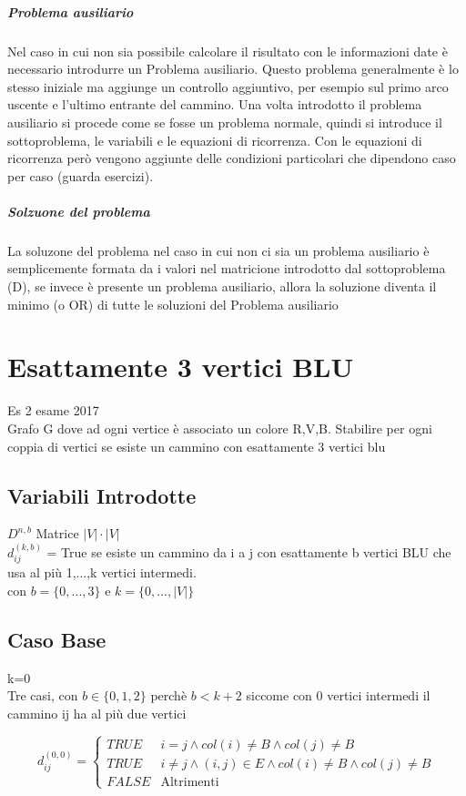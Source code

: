 \documentclass[12pt, a4paper, openany]{book}
\begin{document}
\subparagraph{Problema ausiliario} Nel caso in cui non sia possibile calcolare il risultato con le informazioni date è necessario introdurre un Problema ausiliario.
Questo problema generalmente è lo stesso iniziale ma aggiunge un controllo aggiuntivo, per esempio sul primo arco uscente e l'ultimo entrante del cammino.
Una volta introdotto il problema ausiliario si procede come se fosse un problema normale, quindi si introduce il sottoproblema, le variabili e le equazioni di ricorrenza.
Con le equazioni di ricorrenza però vengono aggiunte delle condizioni particolari che dipendono caso per caso (guarda esercizi).

\subparagraph{Solzuone del problema} La soluzone del problema nel caso in cui non ci sia un problema ausiliario è semplicemente formata da i valori nel matricione introdotto dal sottoproblema (D),
se invece è presente un problema ausiliario, allora la soluzione diventa il minimo (o OR) di tutte le soluzioni del Problema ausiliario
\section{Esattamente 3 vertici BLU} Es 2 esame 2017\\
Grafo G dove ad ogni vertice è associato un colore {R,V,B}. Stabilire per ogni coppia di vertici se esiste un cammino con esattamente 3 vertici blu

\subsection*{Variabili Introdotte}
$D^{n,b}$ Matrice $|V|\cdot|V|$\\
$d^{(k,b)}_{ij}$ = True se esiste un cammino da i a j con esattamente b vertici BLU che usa al più {1,...,k} vertici intermedi.\\
con $b = \{0,...,3\}$ e $k=\{0,...,|V|\}$

\subsection*{Caso Base} k=0\\
Tre casi, con $b \in \{0,1,2\}$ perchè $b < k+2$ siccome con 0 vertici intermedi il cammino ij ha al più due vertici

\begin{equation*}
    d_{ij}^{(0,0)} = \begin{cases}
        TRUE  & i=j\land col(i)\neq B\land col(j)\neq B                      \\
        TRUE  & i\neq j\land (i,j)\in E \land col(i)\neq B\land col(j)\neq B \\
        FALSE & \text{Altrimenti}
    \end{cases}
\end{equation*}
\end{document}
